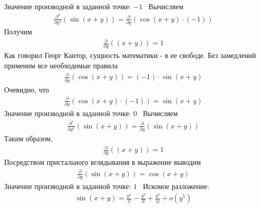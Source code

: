 \documentclass{article}
\begin{document}
Значение производной в заданной точке: $-1$ \ 
Вычисляем
\begin{gather}
\frac{\partial ^{4}}{\partial {y}^{4}}\left(\sin{ \left(x + y\right) }\right)=\frac{\partial }{\partial y}\left(\cos{ \left(x + y\right) } \cdot (-1)\right)
\end{gather}
Получим
\begin{gather}
\frac{\partial }{\partial y}\left(\left(x + y\right)\right)=1
\end{gather}
Как говорил Георг Кантор, сущность математики - в ее свободе. Без замедлений применим все необходимые правила
\begin{gather}
\frac{\partial }{\partial y}\left(\cos{ \left(x + y\right) }\right)=(-1) \cdot \sin{ \left(x + y\right) }
\end{gather}
Очевидно, что
\begin{gather}
\frac{\partial }{\partial y}\left(\cos{ \left(x + y\right) } \cdot (-1)\right)=\sin{ \left(x + y\right) }
\end{gather}
Значение производной в заданной точке: $0$ \ 
Вычисляем
\begin{gather}
\frac{\partial ^{5}}{\partial {y}^{5}}\left(\sin{ \left(x + y\right) }\right)=\frac{\partial }{\partial y}\left(\sin{ \left(x + y\right) }\right)
\end{gather}
Таким образом,
\begin{gather}
\frac{\partial }{\partial y}\left(\left(x + y\right)\right)=1
\end{gather}
Посредством пристального вглядывания в выражение выводим
\begin{gather}
\frac{\partial }{\partial y}\left(\sin{ \left(x + y\right) }\right)=\cos{ \left(x + y\right) }
\end{gather}
Значение производной в заданной точке: $1$ \ 
Искомое разложение:
\begin{gather}
\sin{ \left(x + y\right) }=\frac{{y}^{1}}{1!}-\frac{{y}^{3}}{3!}+\frac{{y}^{5}}{5!}+o({y}^{5})\end{gather}
\end{document}
